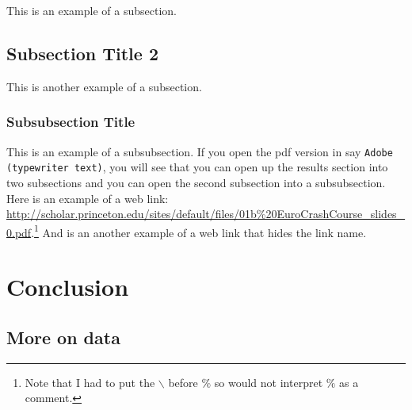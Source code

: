 \documentclass[a4paper,oneside]{article}
\begin{document}
This is an example of a subsection.

\subsection{Subsection Title 2}

This is another example of a subsection.

\subsubsection{Subsubsection Title}\label{sec:sssres}

This is an example of a subsubsection. If you open the pdf version in say \texttt{Adobe (typewriter text)}, you will see that you can open up the results section into two subsections and you can open the second subsection into a subsubsection. Here is an example of a web link: \url{http://scholar.princeton.edu/sites/default/files/01b\%20EuroCrashCourse_slides_0.pdf}.\footnote{Note that I had to put the $\backslash$ before $\%$ so \LaTeXe{} would not interpret $\%$ as a comment.} And   is an another example of a web link that hides the link name.

\section{Conclusion}

\lipsum





\begin{appendices}

\section{More on data}\label{app:dat}

\lipsum

\end{appendices}
\end{document}
